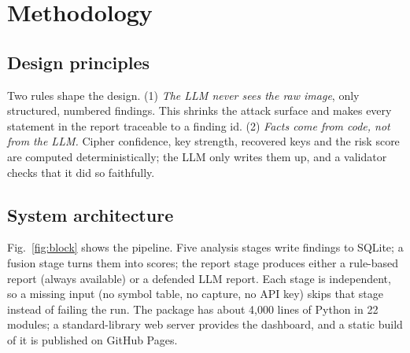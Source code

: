 \section{Methodology}
\label{sec:method}

\subsection{Design principles}
Two rules shape the design. (1) \emph{The LLM never sees the raw image}, only structured, numbered findings.
This shrinks the attack surface and makes every statement in the report traceable to a finding id. (2)
\emph{Facts come from code, not from the LLM.} Cipher confidence, key strength, recovered keys and the risk
score are computed deterministically; the LLM only writes them up, and a validator checks that it did so
faithfully.

\subsection{System architecture}
Fig.~\ref{fig:block} shows the pipeline. Five analysis stages write findings to SQLite; a fusion stage turns
them into scores; the report stage produces either a rule-based report (always available) or a defended LLM
report. Each stage is independent, so a missing input (no symbol table, no capture, no API key) skips that
stage instead of failing the run. The package has about 4{,}000 lines of Python in 22 modules; a
standard-library web server provides the dashboard, and a static build of it is published on GitHub Pages.

